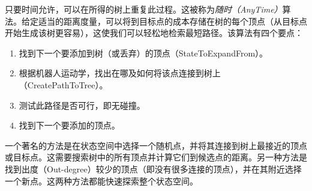 
只要时间允许，可以在所得的树上重复此过程。这被称为\emph{随时（AnyTime）}算法。给定适当的距离度量，可以将到目标点的成本存储在树的每个顶点（从目标点开始生成该树更容易），这使我们可以轻松地检索最短路径。该算法有四个要点：

\begin{enumerate}

\item 找到下一个要添加到树（或丢弃）的顶点（StateToExpandFrom）。
\item 根据机器人运动学，找出在哪及如何将该点连接到树上（CreatePathToTree）。
\item 测试此路径是否可行，即无碰撞。
\item 找到下一个要添加的顶点。
\end{enumerate}


一个著名的方法是在状态空间中选择一个随机点，并将其连接到树上最接近的顶点或目标点。这需要搜索树中的所有顶点并计算它们到候选点的距离。另一种方法是找到出度（Out-degree）较少的顶点（即没有很多连接的顶点），并在其附近选择一个新点。这两种方法都能快速探索整个状态空间。



